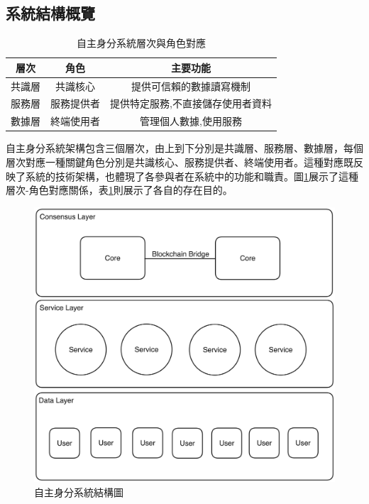 \subsection{系統結構概覽}
\begin{table}[h]
  \centering
  \begin{tabular}{|c|c|c|}
    \hline
    層次  & 角色    & 主要功能              \\
    \hline
    共識層 & 共識核心  & 提供可信賴的數據讀寫機制      \\
    \hline
    服務層 & 服務提供者 & 提供特定服務,不直接儲存使用者資料 \\
    \hline
    數據層 & 終端使用者 & 管理個人數據,使用服務       \\
    \hline
  \end{tabular}
  \caption{自主身分系統層次與角色對應}
  \label{tab:system-layers}
\end{table}
自主身分系統架構包含三個層次，由上到下分別是共識層、服務層、數據層，每個層次對應一種關鍵角色分別是共識核心、服務提供者、終端使用者。這種對應既反映了系統的技術架構，也體現了各參與者在系統中的功能和職責。圖\ref{fig:aid-system-layer}展示了這種層次-角色對應關係，表\ref{tab:system-layers}則展示了各自的存在目的。
\begin{figure}[h]
  \centering
  \includegraphics[width=\linewidth,keepaspectratio]{figures/aidLayers.png}
  \caption{自主身分系統結構圖}
  \label{fig:aid-system-layer}
\end{figure}
